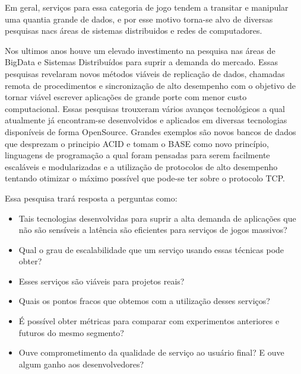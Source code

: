 Em geral, serviços para essa categoria de jogo tendem a transitar e manipular uma quantia grande de dados, e por esse motivo torna-se alvo de diversas pesquisas nacs áreas de sistemas distribuidos e redes de computadores.

Nos ultimos anos houve um elevado investimento na pesquisa nas áreas de BigData e Sistemas Distribuídos para suprir a demanda do mercado. Essas pesquisas revelaram novos métodos viáveis de replicação de dados, chamadas remota de procedimentos e sincronização de alto desempenho com o objetivo de tornar viável escrever aplicações de grande porte com menor custo computacional. Essas pesquisas trouxeram vários avanços tecnológicos a qual atualmente já encontram-se desenvolvidos e aplicados em diversas tecnologias disponíveis de forma OpenSource. Grandes exemplos são novos bancos de dados que desprezam o principio ACID e tomam o BASE como novo princípio, linguagens de programação a qual foram pensadas para serem facilmente escaláveis e modularizadas e a utilização de protocolos de alto desempenho tentando otimizar o máximo possível que pode-se ter sobre o protocolo TCP.

Essa pesquisa trará resposta a perguntas como:

\begin{itemize}
  \item Tais tecnologias desenvolvidas para suprir a alta demanda de aplicações que não são sensíveis a latência são eficientes para serviços de jogos massivos?
  \item Qual o grau de escalabilidade que um serviço usando essas técnicas pode obter?
  \item Esses serviços são viáveis para projetos reais?
  \item Quais os pontos fracos que obtemos com a utilização desses serviços?
  \item É possível obter métricas para comparar com experimentos anteriores e futuros do mesmo segmento?
  \item Ouve comprometimento da qualidade de serviço ao usuário final? E ouve algum ganho aos desenvolvedores?
\end{itemize}
